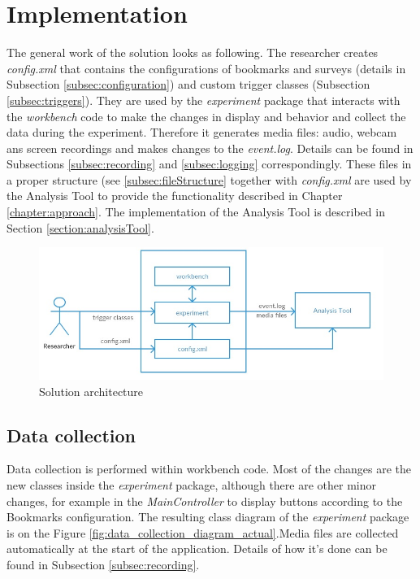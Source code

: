 
\chapter{Implementation}\label{chapter:implementation}

The general work of the solution looks as following. The researcher creates \textit{config.xml} that contains the configurations of bookmarks and surveys (details in Subsection \ref{subsec:configuration}) and custom trigger classes (Subsection \ref{subsec:triggers}). They are used by the \textit{experiment} package that interacts with the \textit{workbench} code to make the changes in display and behavior and collect the data during the experiment. Therefore it generates media files: audio, webcam ans screen recordings and makes changes to the \textit{event.log}. Details can be found in Subsections \ref{subsec:recording} and \ref{subsec:logging} correspondingly. These files in a proper structure (see \ref{subsec:fileStructure} together with \textit{config.xml} are used by the Analysis Tool to provide the functionality described in Chapter \ref{chapter:approach}. The implementation of the Analysis Tool is described in Section \ref{section:analysisTool}.\\

\begin{figure}[htb]
 \centering
\includegraphics[width=\textwidth]{figures/arhitecture.jpg}
\caption{Solution architecture}
\label{fig:architecture}
\end{figure}


\section{Data collection}\label{section:dataCollectionIntegration}

Data collection is performed within workbench code. Most of the changes are the new classes inside the \textit{experiment} package, although there are other minor changes, for example in the \textit{MainController} to display buttons according to the Bookmarks configuration. The resulting class diagram of the \textit{experiment} package is on the Figure \ref{fig:data_collection_diagram_actual}.Media files are collected automatically at the start of the application. Details of how it's done can be found in Subsection \ref{subsec:recording}. \\


